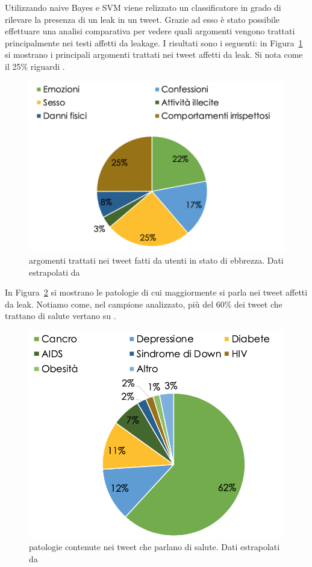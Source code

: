 Utilizzando naive Bayes e SVM viene relizzato un classificatore in grado di rilevare la presenza di un leak in un tweet. Grazie ad esso è stato possibile effettuare una analisi comparativa per vedere quali argomenti vengono trattati principalmente nei testi affetti da leakage. I risultati sono i seguenti: in Figura~\ref{fig:res-ebbrezza} si mostrano i principali argomenti trattati nei tweet affetti da leak. Si nota come il 25\% riguardi .
\begin{figure}[h!t]
    \centering
    \includegraphics[width=15cm]{Figure/related_work/ebbrezza.png}
    \caption{argomenti trattati nei tweet fatti da utenti in stato di ebbrezza. Dati estrapolati da\cite{looseTweets}}
    \label{fig:res-ebbrezza}
\end{figure}
\FloatBarrier

In Figura~\ref{fig:res-patologie} si mostrano le patologie di cui maggiormente si parla nei tweet affetti da leak. Notiamo come, nel campione analizzato, più del 60\% dei tweet che trattano di salute vertano su .

\begin{figure}[h!t]
    \centering
    \includegraphics[width=15cm]{Figure/related_work/patologie.png}
    \caption{patologie contenute nei tweet che parlano di salute. Dati estrapolati da\cite{looseTweets}}
    \label{fig:res-patologie}
\end{figure}
\FloatBarrier

